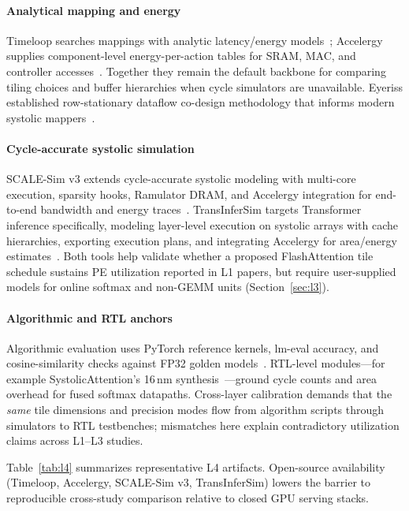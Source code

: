 \documentclass[conference]{IEEEtran}
\begin{document}
\paragraph{Analytical mapping and energy}
Timeloop searches mappings with analytic latency/energy models~\cite{parashar2019timeloop}; Accelergy supplies component-level energy-per-action tables for SRAM, MAC, and controller accesses~\cite{wu2019accelergy}.
Together they remain the default backbone for comparing tiling choices and buffer hierarchies when cycle simulators are unavailable.
Eyeriss established row-stationary dataflow co-design methodology that informs modern systolic mappers~\cite{chen2016eyeriss}.

\paragraph{Cycle-accurate systolic simulation}
SCALE-Sim v3 extends cycle-accurate systolic modeling with multi-core execution, sparsity hooks, Ramulator DRAM, and Accelergy integration for end-to-end bandwidth and energy traces~\cite{scalesimv3_2025}.
TransInferSim targets Transformer inference specifically, modeling layer-level execution on systolic arrays with cache hierarchies, exporting execution plans, and integrating Accelergy for area/energy estimates~\cite{klhufek2025transinfersim}.
Both tools help validate whether a proposed FlashAttention tile schedule sustains PE utilization reported in L1 papers, but require user-supplied models for online softmax and non-GEMM units (Section~\ref{sec:l3}).

\paragraph{Algorithmic and RTL anchors}
Algorithmic evaluation uses PyTorch reference kernels, lm-eval accuracy, and cosine-similarity checks against FP32 golden models~\cite{ashkboos2024quarot,liu2024kivi,guaranteednorm2026}.
RTL-level modules---for example SystolicAttention's 16\,nm synthesis~\cite{lin2025systolicattention}---ground cycle counts and area overhead for fused softmax datapaths.
Cross-layer calibration demands that the \emph{same} tile dimensions and precision modes flow from algorithm scripts through simulators to RTL testbenches; mismatches here explain contradictory utilization claims across L1--L3 studies.

Table~\ref{tab:l4} summarizes representative L4 artifacts.
Open-source availability (Timeloop, Accelergy, SCALE-Sim v3, TransInferSim) lowers the barrier to reproducible cross-study comparison relative to closed GPU serving stacks.
\end{document}
